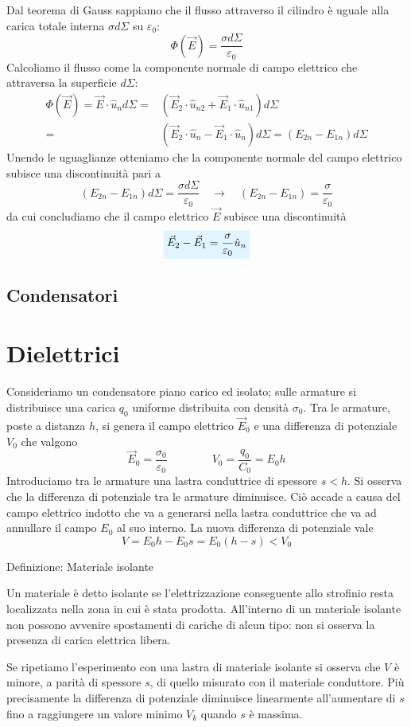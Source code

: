 \documentclass[x11names]{report}
\newcommand{\definizione}[2]{
	\begin{center}
		\fboxsep11pt
		\colorbox{myblue}{\begin{minipage}{5.75in}
				\begin{blues}{Definizione: #1}
					#2
				\end{blues}
		\end{minipage}}
	\end{center}
}
\newcommand{\viola}[1]{%
	\colorbox{myblue}{$\displaystyle #1$}
}
\begin{document}
Dal teorema di Gauss sappiamo che il flusso attraverso il cilindro è uguale alla carica totale interna
 \(\sigma d\Sigma\) su \(\varepsilon_0\):
\[
\Phi(\vec{E}) = \frac{\sigma d\Sigma}{\varepsilon_0}
\]
Calcoliamo il flusso come la componente normale di campo elettrico che attraversa la superficie \(d\Sigma\):
\begin{align*}
	\Phi(\vec{E}) = \vec{E}\cdot \hat{u}_n  d\Sigma =& \left(\vec{E}_2\cdot\hat{u}_{n2} + \vec{E}_1\cdot\hat{u}_{n1} \right) d\Sigma\\ =& \left(\vec{E}_2\cdot\hat{u}_{n} - \vec{E}_1\cdot\hat{u}_{n} \right) d\Sigma = \left(E_{2n} - E_{1n}\right)d\Sigma
\end{align*}
Unendo le uguaglianze otteniamo che la componente normale del campo elettrico subisce una discontinuità pari a 
\[
\left(E_{2n} - E_{1n}\right)d\Sigma = \frac{\sigma d\Sigma}{\varepsilon_0} \quad \to \quad \left(E_{2n} - E_{1n}\right) = \frac{\sigma}{\varepsilon_0}
\]
da cui concludiamo che il campo elettrico \(\vec{E}\) subisce una discontinuità 
\begin{equation}
	\viola{\vec{E}_{2} - \vec{E}_{1} = \frac{\sigma}{\varepsilon_0}\hat{u}_n}
\end{equation}

\subsection{Condensatori}


\section{Dielettrici}
Consideriamo un condensatore piano carico ed isolato; sulle armature si distribuisce una carica \(q_0\) uniforme distribuita con densità \(\sigma_0\). Tra le armature, poste a distanza \(h\), si genera il campo elettrico \(\vec{E}_0\) e una differenza di potenziale \(V_0\) che valgono
\[
\vec{E}_0 = \frac{\sigma_0}{\varepsilon_0} \qquad\qquad V_0 = \frac{q_0}{C_0} = E_0 h
\]
Introduciamo tra le armature una lastra conduttrice di spessore \(s < h\). Si osserva che la differenza di potenziale tra le armature diminuisce. Ciò accade a causa del campo elettrico indotto che va a generarsi nella lastra conduttrice che va ad annullare il campo \(E_0\) al suo interno. La nuova differenza di potenziale vale
\[
V = E_0h - E_0 s = E_0(h-s) < V_0
\]
\definizione{Materiale isolante}{
Un materiale è detto isolante se l'elettrizzazione conseguente allo strofinio resta localizzata nella zona in cui è stata prodotta. All'interno di un materiale isolante non possono avvenire spostamenti di cariche di alcun tipo: non si osserva la presenza di carica elettrica libera.
}
Se ripetiamo l'esperimento con una lastra di materiale isolante si osserva che \(V\) è minore, a parità di spessore \(s\), di quello misurato con il materiale conduttore. Più precisamente la differenza di potenziale diminuisce linearmente all'aumentare di \(s\) fino a raggiungere un valore minimo \(V_k\) quando \(s\) è massima.
\end{document}
